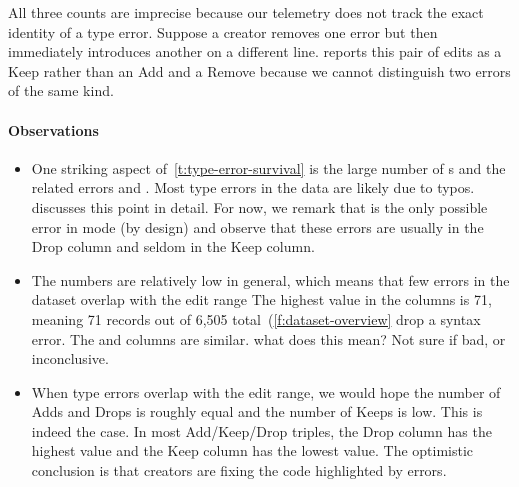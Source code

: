 \documentclass[english,submission,cleveref]{programming}
\begin{document}
All three counts are imprecise because our telemetry does not track the exact
identity of a type error.
Suppose a creator removes one  error but then
immediately introduces another on a different line.
 reports this pair of edits as a Keep rather than
an Add and a Remove because we cannot distinguish two errors of the same kind.


\paragraph{Observations}

\begin{itemize}
  \item
    One striking aspect of~\cref{t:type-error-survival} is the large number
    of s and the related errors  and
    .
    Most type errors in the data are likely due to typos.
     discusses this point in detail.
    For now, we remark that  is the only possible error
    in \mnocheck{} mode (by design) and observe that these errors are
    usually in the Drop column and seldom in the Keep column.

  \item
    The numbers are relatively low in general, which means that
    few errors in the dataset overlap with the edit range
    The highest value in the \mstrict{} columns is 71, meaning 71 records
    out of 6,505 total~(\cref{f:dataset-overview} drop a syntax error.
    The \mnonstrict{} and \mnocheck{} columns are similar.
    \FILL{} what does this mean? Not sure if bad, or inconclusive.

  \item
    When type errors overlap with the edit range,
    we would hope the number of Adds and Drops is roughly
    equal and the number of Keeps is low.
    This is indeed the case.
    In most Add/Keep/Drop triples, the Drop column has the highest
    value and the Keep column has the lowest value.
    The optimistic conclusion is that creators are fixing the code
    highlighted by errors.


\end{itemize}
\end{document}
